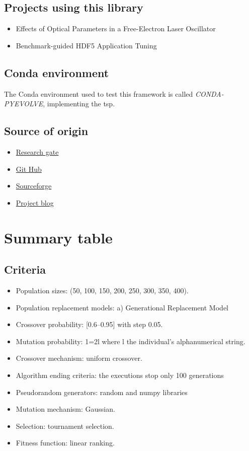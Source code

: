\documentclass{article}
\begin{document}
\subsection{Projects using this library}
\begin{itemize}
    \item Effects of Optical Parameters in a Free-Electron Laser Oscillator
    \item Benchmark-guided HDF5 Application Tuning
\end{itemize}
\subsection{Conda environment}
The Conda environment used to test this framework is called \textit{CONDA-PYEVOLVE}, implementing the tsp.
\subsection{Source of origin}
\begin{itemize}
    \item \href{https://www.researchgate.net/publication/285104816_Pyevolve_A_Python_open-source_framework_for_genetic_algorithms}{Research gate}
    \item \href{https://github.com/sjspielman/pyvolve}{Git Hub}
    \item \href{http://pyevolve.sourceforge.net/0_6rc1/index.html}{Sourceforge}
    \item \href{http://blog.christianperone.com/?s=pyevolve}{Project blog}
\end{itemize}

\section{Summary table}


\subsection{Criteria}
    \begin{itemize}
        \item Population sizes: (50, 100, 150, 200, 250, 300, 350, 400).
        \item Population replacement models: a) Generational Replacement Model
        \item Crossover probability: [0.6–0.95] with step 0.05.
        \item Mutation probability: 1=2l where l the individual’s alphanumerical string.
        \item Crossover mechanism: uniform crossover.
        \item Algorithm ending criteria: the executions stop only 100 generations
        \item Pseudorandom generators: random and numpy libraries
        \item Mutation mechanism: Gaussian.
        \item Selection: tournament selection.
        \item Fitness function: linear ranking.
    \end{itemize}{}
\end{document}
